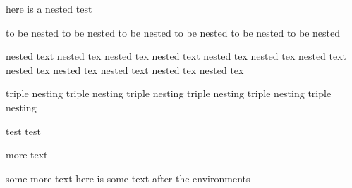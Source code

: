 here is a nested test
\begin{one} 
	to be nested to be nested 
	to be nested to be nested 
	to be nested to be nested 	 
	\begin{two} 
		nested text nested tex nested tex 
		nested text nested tex nested tex 
		nested text nested tex nested tex 
		nested text nested tex nested tex 		 
		\begin{three} 
			triple nesting 
			triple nesting 
			triple nesting 
			triple nesting 
			triple nesting 
			triple nesting  
		\end{three} test test
	\end{two} more text
\end{one}           some more text 
here is some text after the environments 
